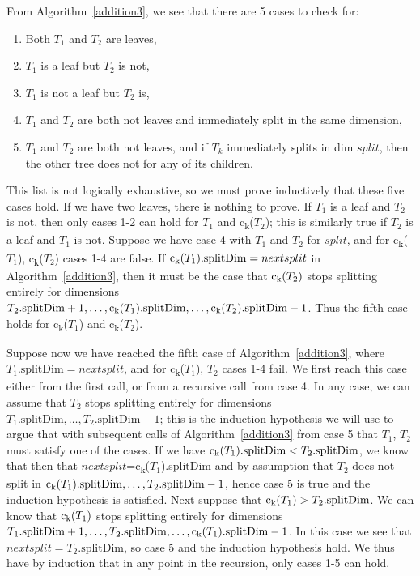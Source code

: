 \documentclass{article}
\newcommand{\child}[1]{c\textsubscript{#1}}
\begin{document}
From Algorithm~\ref{addition3}, we see that there are 5 cases to check for:
\begin{enumerate}
\item Both $T_1$ and $T_2$ are leaves,
\item $T_1$ is a leaf but $T_2$ is not,
\item $T_1$ is not a leaf but $T_2$ is,
\item $T_1$ and $T_2$ are both not leaves and immediately split in the same dimension,
\item $T_1$ and $T_2$ are both not leaves, and if $T_k$ immediately splits in dim $split$, then the other tree does not for any of its children.
\end{enumerate}
This list is not logically exhaustive, so we must prove inductively that these five cases hold. If we have two leaves, there is nothing to prove. If $T_1$ is a leaf and $T_2$ is not, then only cases 1-2 can hold for $T_1$ and \child{k}($T_2$); this is similarly true if $T_2$ is a leaf and $T_1$ is not. Suppose we have case 4 with $T_1$ and $T_2$ for $split$, and for \child{k}($T_1$), \child{k}($T_2$) cases 1-4 are false. If $\text{\child{k}}(T_1).\text{splitDim}=nextsplit$ in Algorithm~\ref{addition3}, then it must be the case that $\text{\child{k}}(T_2)$ stops splitting entirely for dimensions $T_2.\text{splitDim}+1,\dots,\text{\child{k}}(T_1).\text{splitDim},\dots,\text{\child{k}}(T_2).\text{splitDim}-1$. Thus the fifth case holds for \child{k}($T_1$) and \child{k}($T_2$).

Suppose now we have reached the fifth case of Algorithm~\ref{addition3}, where $T_1.\text{splitDim}=nextsplit$, and for \child{k}($T_1$), $T_2$ cases 1-4 fail. We first reach this case either from the first call, or from a recursive call from case 4. In any case, we can assume that $T_2$ stops splitting entirely for dimensions $T_1.\text{splitDim},\dots,T_2.\text{splitDim}-1$; this is the induction hypothesis we will use to argue that with subsequent calls of Algorithm~\ref{addition3} from case 5 that $T_1$, $T_2$ must satisfy one of the cases. If we have $\text{\child{k}}(T_1).\text{splitDim}<T_2.\text{splitDim}$, we know that then that $nextsplit$=\child{k}($T_1$).splitDim and by assumption that $T_2$ does not split in $\text{\child{k}}(T_1).\text{splitDim},\dots,T_2.\text{splitDim}-1$, hence case 5 is true and the induction hypothesis is satisfied. Next suppose that $\text{\child{k}}(T_1)>T_2.\text{splitDim}$. We can know that $\text{\child{k}}(T_1)$ stops splitting entirely for dimensions $T_1.\text{splitDim}+1,\dots,T_2.\text{splitDim},\dots,\text{\child{k}}(T_1).\text{splitDim}-1$. In this case we see that $nextsplit=T_2.\text{splitDim}$, so case 5 and the induction hypothesis hold. We thus have by induction that in any point in the recursion, only cases 1-5 can hold.
\end{document}
